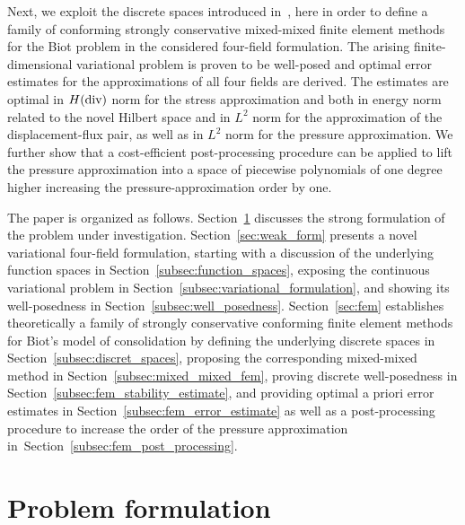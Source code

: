 \documentclass[11pt]{amsart}
\theoremstyle{remark}
\theoremstyle{definition}
\begin{document}
Next, we exploit the discrete spaces introduced in~\cite{ChenHuang2022}, here in order to define a family of conforming strongly conservative mixed-mixed finite element methods for the Biot problem in the considered four-field formulation. The arising finite-dimensional variational problem is proven to be well-posed and optimal error estimates for the approximations
of all four fields are derived. The estimates are optimal in $H(\rm div)$ norm for the stress approximation and both in energy norm related to the novel Hilbert space and in $L^2$ norm for the approximation of the displacement-flux pair, as well as in $L^2$ norm for the pressure approximation.
We further show that a cost-efficient post-processing procedure can be applied to lift the pressure approximation into a space of piecewise polynomials
of one degree higher increasing the pressure-approximation order by one.

The paper is organized as follows. Section~\ref{sec:formulation} discusses the strong formulation of the problem under investigation. Section~\ref{sec:weak_form} presents a novel variational four-field formulation, starting with a discussion
of the underlying function spaces in Section~\ref{subsec:function_spaces}, exposing the continuous variational problem in Section~\ref{subsec:variational_formulation}, and showing its well-posedness in Section~\ref{subsec:well_posedness}. Section~\ref{sec:fem} establishes theoretically a family of strongly conservative conforming finite element methods for Biot's model of consolidation by defining the underlying discrete spaces in Section~\ref{subsec:discret_spaces}, proposing the corresponding mixed-mixed method in Section~\ref{subsec:mixed_mixed_fem},
{
proving discrete well-posedness in Section~\ref{subsec:fem_stability_estimate}, and providing optimal a priori error estimates in Section~\ref{subsec:fem_error_estimate} as well as a post-processing procedure to increase the order of the pressure
approximation in~Section~\ref{subsec:fem_post_processing}.
}

\section{Problem formulation}\label{sec:formulation} 
\end{document}
